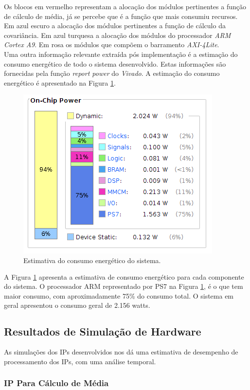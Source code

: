 Os blocos em vermelho representam a alocação dos módulos pertinentes a função de cálculo de média, já se percebe que é a função que mais consumiu recursos. Em azul escuro a alocação dos módulos pertinentes a função de cálculo da covariância. Em azul turquesa a alocação dos módulos do processador \textit{ARM Cortex A9}. 
Em rosa os módulos que compõem o barramento \textit{AXI-4Lite}.\\
Uma outra informação relevante extraída pós implementação é a estimação do consumo energético de todo o sistema desenvolvido. Estas informações são fornecidas pela função \textit{report power} do \textit{Vivado}. A estimação do consumo energético é apresentado na Figura \ref{power}.
\begin{figure}[!h]
	\centering
	\includegraphics[keepaspectratio=true,scale=0.5]{figuras/power.png}
	\caption{Estimativa do consumo energético do sistema.}
	\label{power}
\end{figure}

A Figura \ref{power} apresenta a estimativa de consumo energético para cada componente do sistema. O processador ARM representado por PS7 na Figura \ref{power}, é o que tem maior consumo, com aproximadamente 75\% do consumo total. O sistema em geral apresentou o consumo geral de 2.156 watts.
 

\subsection{Resultados de Simulação de Hardware}
As simulações dos IPs desenvolvidos nos dá uma estimativa de desempenho de processamento dos IPs, com uma análise temporal. 

\subsubsection{IP Para Cálculo de Média}


